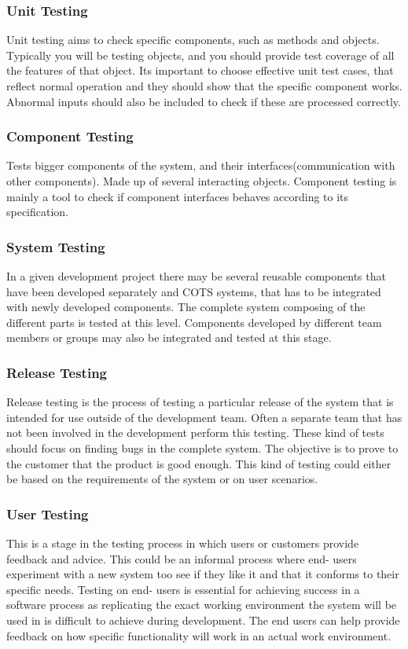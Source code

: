 \subsubsection{Unit Testing}
Unit testing aims to check specific components, such as methods and objects. Typically you will be testing objects, and you should provide test coverage of all the features of that object. Its important to choose effective unit test cases, that reflect normal operation and they should show that the specific component works. Abnormal inputs should also be included to check if these are processed correctly.

\subsubsection{Component Testing}
Tests bigger components of the system, and their interfaces(communication with other components). Made up of several interacting objects. Component testing is mainly a tool to check if component interfaces behaves according to its specification.

\subsubsection{System Testing}
In a given development project there may be several reusable components that have been developed separately and COTS systems, that has to be integrated with newly developed components. The complete system composing of the different parts is tested at this level. Components developed by different team members or groups may also be integrated and tested at this stage.

\subsubsection{Release Testing}
Release testing is the process of testing a particular release of the system that is intended for use outside of the development team. Often a separate team that has not been involved in the development perform this testing. These kind of tests should focus on finding bugs in the complete system. The objective is to prove to the customer that the product is good enough. This kind of testing could either be based on the requirements of the system or on user scenarios.

\subsubsection{User Testing}
This is a stage in the testing process in which users or customers provide feedback and advice. This could be an informal process where end- users experiment with a new system too see if they like it and that it conforms to their specific needs. Testing on end- users is essential for achieving success in a software process as replicating the exact working environment the system will be used in is difficult to achieve during development. The end users can help provide feedback on how specific functionality will work in an actual work environment.

